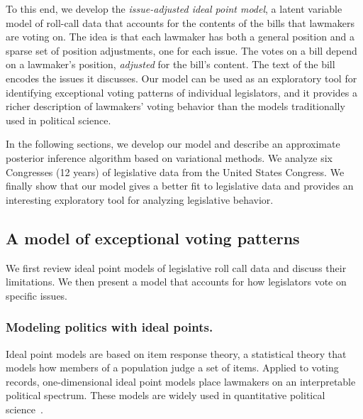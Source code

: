
To this end, we develop the \emph{issue-adjusted ideal point model}, a
latent variable model of roll-call data that accounts for the contents
of the bills that lawmakers are voting on.  The idea is that each
lawmaker has both a general position and a sparse set of position
adjustments, one for each issue.  The votes on a bill depend on a
lawmaker's position, \emph{adjusted} for the bill's content.  The text
of the bill encodes the issues it discusses. Our model can be used as
an exploratory tool for identifying exceptional voting patterns of
individual legislators, and it provides a richer description of
lawmakers' voting behavior than the models traditionally used in
political science.


In the following sections, we develop our model and describe an
approximate posterior inference algorithm based on variational
methods.  We analyze six Congresses (12 years) of legislative data
from the United States Congress.  We finally show that our model gives
a better fit to legislative data and provides an interesting
exploratory tool for analyzing legislative behavior.

\subsection{A model of exceptional voting patterns}
\label{section:exceptional_model}

We first review ideal point models of legislative roll call data and discuss
their limitations.  We then present a model that accounts for how
legislators vote on specific issues.

\subsubsection{Modeling politics with ideal points.}

Ideal point models are based on item response theory, a statistical
theory that models how members of a population judge a set of items.
Applied to voting records, one-dimensional ideal point models place
lawmakers on an interpretable political spectrum.  These models are
widely used in quantitative political
science~\citep{clinton:2004,poole:1985,martin:2002}.

